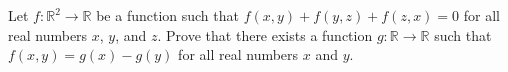 Let $f: \mathbb{R}^2 \to \mathbb{R}$ be a function such that $f(x,y) + f(y,z)
+ f(z,x) = 0$ for all real numbers $x$, $y$, and $z$. Prove that there exists
a function $g: \mathbb{R} \to \mathbb{R}$ such that $f(x,y) = g(x) - g(y)$
for all real numbers $x$ and $y$.
